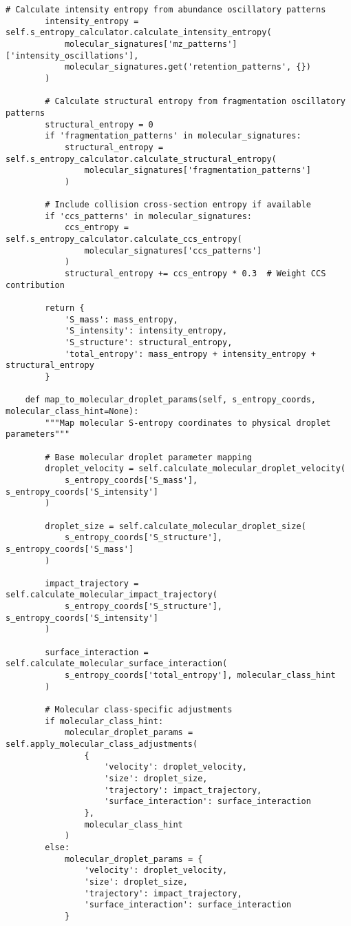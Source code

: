 \documentclass[12pt,a4paper]{article}
\begin{document}
\begin{lstlisting}[style=pythonstyle, caption=Core Ion-to-Drip Implementation for Mass Spectrometry]
        # Calculate intensity entropy from abundance oscillatory patterns
        intensity_entropy = self.s_entropy_calculator.calculate_intensity_entropy(
            molecular_signatures['mz_patterns']['intensity_oscillations'],
            molecular_signatures.get('retention_patterns', {})
        )
        
        # Calculate structural entropy from fragmentation oscillatory patterns
        structural_entropy = 0
        if 'fragmentation_patterns' in molecular_signatures:
            structural_entropy = self.s_entropy_calculator.calculate_structural_entropy(
                molecular_signatures['fragmentation_patterns']
            )
        
        # Include collision cross-section entropy if available
        if 'ccs_patterns' in molecular_signatures:
            ccs_entropy = self.s_entropy_calculator.calculate_ccs_entropy(
                molecular_signatures['ccs_patterns']
            )
            structural_entropy += ccs_entropy * 0.3  # Weight CCS contribution
        
        return {
            'S_mass': mass_entropy,
            'S_intensity': intensity_entropy,
            'S_structure': structural_entropy,
            'total_entropy': mass_entropy + intensity_entropy + structural_entropy
        }
    
    def map_to_molecular_droplet_params(self, s_entropy_coords, molecular_class_hint=None):
        """Map molecular S-entropy coordinates to physical droplet parameters"""
        
        # Base molecular droplet parameter mapping
        droplet_velocity = self.calculate_molecular_droplet_velocity(
            s_entropy_coords['S_mass'], s_entropy_coords['S_intensity']
        )
        
        droplet_size = self.calculate_molecular_droplet_size(
            s_entropy_coords['S_structure'], s_entropy_coords['S_mass']
        )
        
        impact_trajectory = self.calculate_molecular_impact_trajectory(
            s_entropy_coords['S_structure'], s_entropy_coords['S_intensity']
        )
        
        surface_interaction = self.calculate_molecular_surface_interaction(
            s_entropy_coords['total_entropy'], molecular_class_hint
        )
        
        # Molecular class-specific adjustments
        if molecular_class_hint:
            molecular_droplet_params = self.apply_molecular_class_adjustments(
                {
                    'velocity': droplet_velocity,
                    'size': droplet_size,
                    'trajectory': impact_trajectory,
                    'surface_interaction': surface_interaction
                },
                molecular_class_hint
            )
        else:
            molecular_droplet_params = {
                'velocity': droplet_velocity,
                'size': droplet_size,
                'trajectory': impact_trajectory,
                'surface_interaction': surface_interaction
            }
        

\end{lstlisting}
\end{document}

